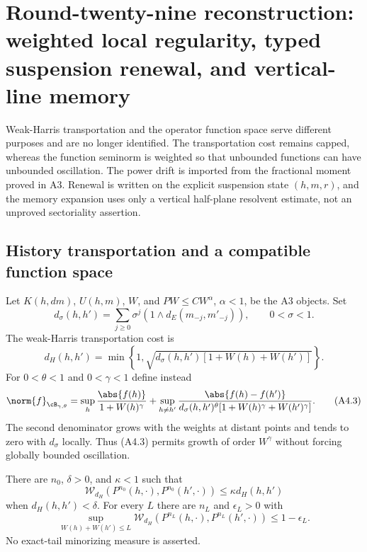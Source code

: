 \section{Round-twenty-nine reconstruction: weighted local regularity, typed suspension renewal, and vertical-line memory}
\label{sec:r29-a4}

Weak-Harris transportation and the operator function space serve different
purposes and are no longer identified.  The transportation cost remains
capped, whereas the function seminorm is weighted so that unbounded functions
can have unbounded oscillation.  The power drift is imported from the
fractional moment proved in A3.  Renewal is written on the explicit suspension
state $(h,m,r)$, and the memory expansion uses only a vertical half-plane
resolvent estimate, not an unproved sectoriality assertion.

\subsection{History transportation and a compatible function space}

Let $K(h,dm)$, $U(h,m)$, $W$, and
$PW\le CW^\alpha$, $\alpha<1$, be the A3 objects.  Set
\[
 d_\sigma(h,h')=\sum_{j\ge0}\sigma^j
  (1\wedge d_E(m_{-j},m'_{-j})),\qquad0<\sigma<1.          \tag{A4.1}
\]
The weak-Harris transportation cost is
\[
 d_H(h,h')=\min\left\{1,
 \sqrt{d_\sigma(h,h')[1+W(h)+W(h')] }\right\}.             \tag{A4.2}
\]
For $0<\theta<1$ and $0<\gamma<1$ define instead
\[
 \norm{f}_{\cB_{\gamma,\theta}}
 =\sup_h{\abs{f(h)}\over1+W(h)^\gamma}
 +\sup_{h\ne h'}{\abs{f(h)-f(h')}\over
 d_\sigma(h,h')^\theta[1+W(h)^\gamma+W(h')^\gamma]}.
                                                                    \tag{A4.3}
\]
The second denominator grows with the weights at distant points and tends to
zero with $d_\sigma$ locally.  Thus (A4.3) permits growth of order $W^\gamma$
without forcing globally bounded oscillation.

\begin{lemma}
\label{lem:r29-a4-coupling}
There are $n_0$, $\delta>0$, and $\kappa<1$ such that
\[
 \mathcal W_{d_H}(P^{n_0}(h,\cdot),P^{n_0}(h',\cdot))
 \le\kappa d_H(h,h')                                     \tag{A4.4}
\]
when $d_H(h,h')<\delta$.  For every $L$ there are $n_L$ and
$\epsilon_L>0$ with
\[
 \sup_{W(h)+W(h')\le L}
 \mathcal W_{d_H}(P^{n_L}(h,\cdot),P^{n_L}(h',\cdot))
 \le1-\epsilon_L.                                        \tag{A4.5}
\]
No exact-tail minorizing measure is asserted.
\end{lemma}

